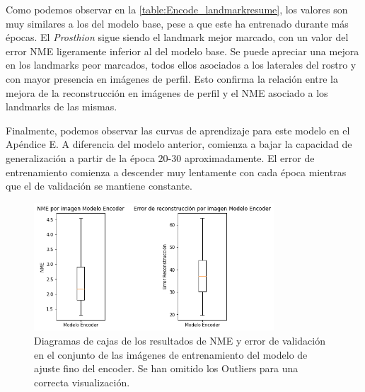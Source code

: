         \noindent Como podemos observar en la \autoref{table:Encode_landmarkresume}, los valores son muy similares a los del modelo base, pese a que este ha entrenado durante más épocas. El \textit{Prosthion} sigue siendo el landmark mejor marcado, con un valor del error NME ligeramente inferior al del modelo base. Se puede apreciar una mejora en los landmarks peor marcados, todos ellos asociados a los laterales del rostro y con mayor presencia en imágenes de perfil. Esto confirma la relación entre la mejora de la reconstrucción en imágenes de perfil y el NME asociado a los landmarks de las mismas.
    

        \medskip
    
        \noindent Finalmente, podemos observar las curvas de aprendizaje para este modelo en el Apéndice E. A diferencia del modelo anterior, comienza a bajar la capacidad de generalización a partir de la época $20$-$30$ aproximadamente. El error de entrenamiento comienza a descender muy lentamente con cada época mientras que el de validación se mantiene constante.
    

        \begin{figure}[h!]
            \centering
            \includegraphics[width=0.8\textwidth]{img/boxplot_encoder.png}
            \caption{Diagramas de cajas de los resultados de NME y error de validación en el conjunto de las imágenes de entrenamiento del modelo de ajuste fino del encoder. Se han omitido los Outliers para una correcta visualización.}
            \label{fig:boxplot_ModeloEncoder_NME}
        \end{figure}



